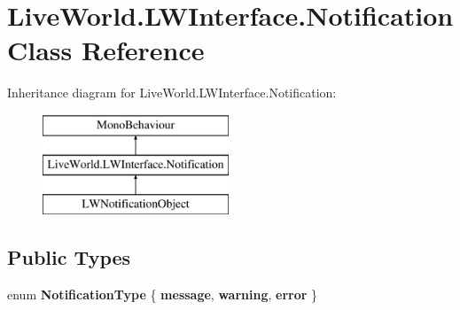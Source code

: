 \hypertarget{class_live_world_1_1_l_w_interface_1_1_notification}{}\section{Live\+World.\+L\+W\+Interface.\+Notification Class Reference}
\label{class_live_world_1_1_l_w_interface_1_1_notification}
Inheritance diagram for Live\+World.\+L\+W\+Interface.\+Notification\+:\begin{figure}[H]
\begin{center}
\leavevmode
\includegraphics[height=3.000000cm]{class_live_world_1_1_l_w_interface_1_1_notification}
\end{center}
\end{figure}
\subsection*{Public Types}
\begin{DoxyCompactItemize}
\item 
\hypertarget{class_live_world_1_1_l_w_interface_1_1_notification_a136480449dfc5b6cd780c4e73c5a6e8a}{}enum {\bfseries Notification\+Type} \{ {\bfseries message}, 
{\bfseries warning}, 
{\bfseries error}
 \}\label{class_live_world_1_1_l_w_interface_1_1_notification_a136480449dfc5b6cd780c4e73c5a6e8a}

\end{DoxyCompactItemize}
